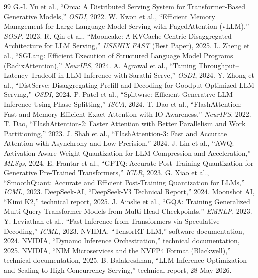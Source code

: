 \documentclass[11pt]{article}
\begin{document}
\begin{thebibliography}{99}
\small
{} G.-I. Yu et al., ``Orca: A Distributed Serving System for Transformer-Based Generative Models,'' \emph{OSDI}, 2022.
 W. Kwon et al., ``Efficient Memory Management for Large Language Model Serving with PagedAttention (vLLM),'' \emph{SOSP}, 2023.
 R. Qin et al., ``Mooncake: A KVCache-Centric Disaggregated Architecture for LLM Serving,'' \emph{USENIX FAST} (Best Paper), 2025.
 L. Zheng et al., ``SGLang: Efficient Execution of Structured Language Model Programs (RadixAttention),'' \emph{NeurIPS}, 2024.
 A. Agrawal et al., ``Taming Throughput--Latency Tradeoff in LLM Inference with Sarathi-Serve,'' \emph{OSDI}, 2024.
 Y. Zhong et al., ``DistServe: Disaggregating Prefill and Decoding for Goodput-Optimized LLM Serving,'' \emph{OSDI}, 2024.
 P. Patel et al., ``Splitwise: Efficient Generative LLM Inference Using Phase Splitting,'' \emph{ISCA}, 2024.
 T. Dao et al., ``FlashAttention: Fast and Memory-Efficient Exact Attention with IO-Awareness,'' \emph{NeurIPS}, 2022.
 T. Dao, ``FlashAttention-2: Faster Attention with Better Parallelism and Work Partitioning,'' 2023.
 J. Shah et al., ``FlashAttention-3: Fast and Accurate Attention with Asynchrony and Low-Precision,'' 2024.
 J. Lin et al., ``AWQ: Activation-Aware Weight Quantization for LLM Compression and Acceleration,'' \emph{MLSys}, 2024.
 E. Frantar et al., ``GPTQ: Accurate Post-Training Quantization for Generative Pre-Trained Transformers,'' \emph{ICLR}, 2023.
 G. Xiao et al., ``SmoothQuant: Accurate and Efficient Post-Training Quantization for LLMs,'' \emph{ICML}, 2023.
 DeepSeek-AI, ``DeepSeek-V3 Technical Report,'' 2024.
 Moonshot AI, ``Kimi K2,'' technical report, 2025.
 J. Ainslie et al., ``GQA: Training Generalized Multi-Query Transformer Models from Multi-Head Checkpoints,'' \emph{EMNLP}, 2023.
 Y. Leviathan et al., ``Fast Inference from Transformers via Speculative Decoding,'' \emph{ICML}, 2023.
 NVIDIA, ``TensorRT-LLM,'' software documentation, 2024.
 NVIDIA, ``Dynamo Inference Orchestration,'' technical documentation, 2025.
 NVIDIA, ``NIM Microservices and the NVFP4 Format (Blackwell),'' technical documentation, 2025.
 B. Balakreshnan, ``LLM Inference Optimization and Scaling to High-Concurrency Serving,'' technical report, 28 May 2026.
\end{thebibliography}
\end{document}
